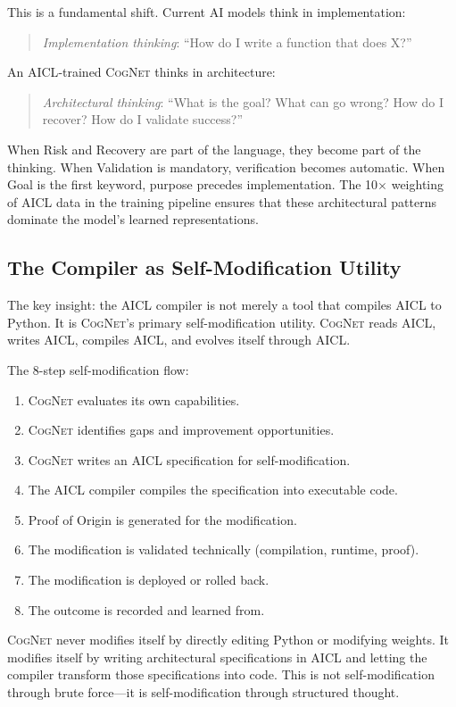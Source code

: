 \documentclass[11pt]{article}
\newcommand{\aicl}{\textsc{AICL}}
\newcommand{\cognet}{\textsc{CogNet}}
\newcommand{\proofoforigin}{Proof of Origin}
\begin{document}
This is a fundamental shift. Current AI models think in implementation:
\begin{quote}
\textit{Implementation thinking}: ``How do I write a function that does X?''
\end{quote}
An \aicl{}-trained \cognet{} thinks in architecture:
\begin{quote}
\textit{Architectural thinking}: ``What is the goal? What can go wrong? How do I recover? How do I validate success?''
\end{quote}

When Risk and Recovery are part of the language, they become part of the thinking. When Validation is mandatory, verification becomes automatic. When Goal is the first keyword, purpose precedes implementation. The 10$\times$ weighting of \aicl{} data in the training pipeline ensures that these architectural patterns dominate the model's learned representations.

\subsection{The Compiler as Self-Modification Utility}
\label{sec:synthesis:compiler}

The key insight: the \aicl{} compiler is not merely a tool that compiles \aicl{} to Python. It is \cognet{}'s primary self-modification utility. \cognet{} reads \aicl{}, writes \aicl{}, compiles \aicl{}, and evolves itself through \aicl{}.

The 8-step self-modification flow:
\begin{enumerate}[leftmargin=*,itemsep=2pt]
  \item \cognet{} evaluates its own capabilities.
  \item \cognet{} identifies gaps and improvement opportunities.
  \item \cognet{} writes an \aicl{} specification for self-modification.
  \item The \aicl{} compiler compiles the specification into executable code.
  \item \proofoforigin{} is generated for the modification.
  \item The modification is validated technically (compilation, runtime, proof).
  \item The modification is deployed or rolled back.
  \item The outcome is recorded and learned from.
\end{enumerate}

\cognet{} never modifies itself by directly editing Python or modifying weights. It modifies itself by writing architectural specifications in \aicl{} and letting the compiler transform those specifications into code. This is not self-modification through brute force---it is self-modification through structured thought.
\end{document}
